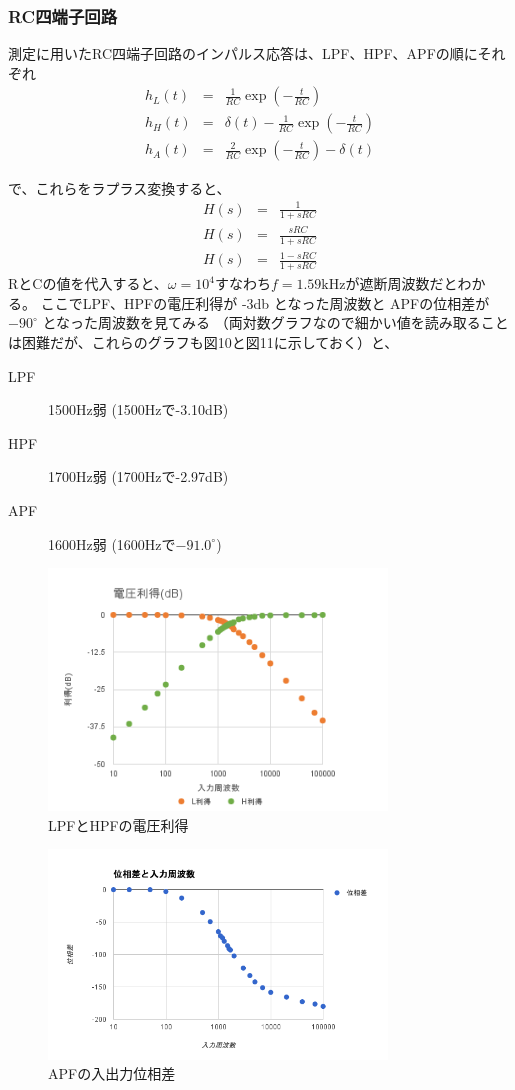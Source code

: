 \documentclass[10pt,a4j,dvipdfmx]{jsarticle}
\begin{document}
\subsubsection{RC四端子回路}
測定に用いたRC四端子回路のインパルス応答は、LPF、HPF、APFの順にそれぞれ
\begin{eqnarray}
h_{L}\left(t\right) &=& \frac{1}{RC}\exp(-\frac{t}{RC}) \\
h_{H}\left(t\right) &=& \delta(t) - \frac{1}{RC}\exp(-\frac{t}{RC}) \\
h_{A}\left(t\right) &=& \frac{2}{RC}\exp(-\frac{t}{RC}) - \delta(t)
\end{eqnarray}

で、これらをラプラス変換すると、
\begin{eqnarray}
H\left(s\right) &=& \frac{1}{1+sRC} \\
H\left(s\right) &=& \frac{sRC}{1+sRC} \\
H\left(s\right) &=& \frac{1-sRC}{1+sRC}
\end{eqnarray}
RとCの値を代入すると、$\omega = 10^4$すなわち$f=1.59\si{\kilo\hertz}$が遮断周波数だとわかる。
ここでLPF、HPFの電圧利得が
-3\si{\decibel}
となった周波数と
APFの位相差が $-90^{\circ}$ となった周波数を見てみる
（両対数グラフなので細かい値を読み取ることは困難だが、これらのグラフも図10と図11に示しておく）と、

\begin{description}
 \item[LPF] 1500Hz弱 (1500Hzで-3.10dB)
 \item[HPF] 1700Hz弱 (1700Hzで-2.97dB)
 \item[APF] 1600Hz弱 (1600Hzで$-91.0^{\circ}$)
\end{description}
\begin{figure}[H]
  \centering
  \includegraphics[width=9cm]{ritoku.png}
  \caption{LPFとHPFの電圧利得}
\end{figure}
\begin{figure}[H]
  \centering
  \includegraphics[width=9cm]{isousaApf.png}
  \caption{APFの入出力位相差}
\end{figure}
\end{document}
